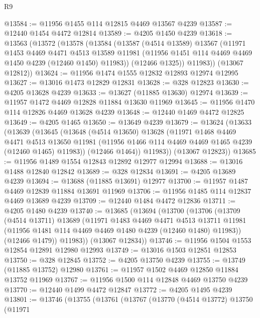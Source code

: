 \begin{lexlean}{R9}
\begin{coremodule}
@13584 := @11956 @1455 @114 @12815 @4469 @13567 @4239
@13587 := @12440 @1454 @4472 @12814
@13589 := @4205 @1450 @4239
@13618 := @13563
    (@13572
      (@13578
        (@13584
          (@13587
            (@4514 @13589)
            @13567
            (@11971
              @1453
              @4469
              @4471
              @4513
              @13589
              @11981
              (@11956 @1451 @114 @4469 @4469 @1450 @4239 (@12460 @1450) @11983))
            (@12466 @1325))
          @11983))
      (@13067 @12812))
@13624 := @11956 @1474 @1555 @12832 @12893 @12974 @12995
@13627 := @13016 @1473 @12829 @12831
@13628 := @328 @12823
@13630 := @4205 @13628 @4239
@13633 := @13627 (@11885 @13630) @12974
@13639 := @11957 @1472 @4469 @12828 @11884 @13630 @11969
@13645 := @11956 @1470 @114 @12826 @4469 @13628 @4239
@13648 := @12440 @1469 @4472 @12825
@13649 := @4205 @1465
@13650 := @13649 @4239
@13679 := @13624
    (@13633
      (@13639
        (@13645
          (@13648
            (@4514 @13650)
            @13628
            (@11971
              @1468
              @4469
              @4471
              @4513
              @13650
              @11981
              (@11956 @1466 @114 @4469 @4469 @1465 @4239 (@12460 @1465) @11983))
            (@12466 @1464))
          @11983))
      (@13067 @12823))
@13685 := @11956 @1489 @1554 @12843 @12892 @12977 @12994
@13688 := @13016 @1488 @12840 @12842
@13689 := @328 @12834
@13691 := @4205 @13689 @4239
@13694 := @13688 (@11885 @13691) @12977
@13700 := @11957 @1487 @4469 @12839 @11884 @13691 @11969
@13706 := @11956 @1485 @114 @12837 @4469 @13689 @4239
@13709 := @12440 @1484 @4472 @12836
@13711 := @4205 @1480 @4239
@13740 := @13685
    (@13694
      (@13700
        (@13706
          (@13709
            (@4514 @13711)
            @13689
            (@11971
              @1483
              @4469
              @4471
              @4513
              @13711
              @11981
              (@11956 @1481 @114 @4469 @4469 @1480 @4239 (@12460 @1480) @11983))
            (@12466 @1479))
          @11983))
      (@13067 @12834))
@13746 := @11956 @1504 @1553 @12854 @12891 @12980 @12993
@13749 := @13016 @1503 @12851 @12853
@13750 := @328 @12845
@13752 := @4205 @13750 @4239
@13755 := @13749 (@11885 @13752) @12980
@13761 := @11957 @1502 @4469 @12850 @11884 @13752 @11969
@13767 := @11956 @1500 @114 @12848 @4469 @13750 @4239
@13770 := @12440 @1499 @4472 @12847
@13772 := @4205 @1495 @4239
@13801 := @13746
    (@13755
      (@13761
        (@13767
          (@13770
            (@4514 @13772)
            @13750
            (@11971

\end{coremodule}
\end{lexlean}
